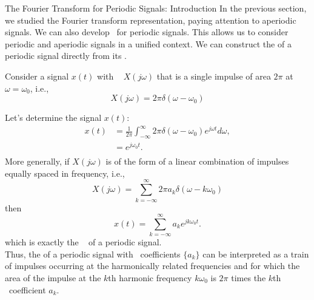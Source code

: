 \begin{frame}{The Fourier Transform for Periodic Signals: Introduction}
    In the previous section, we studied the Fourier transform representation, paying attention to aperiodic signals. We can also develop \ftrs~for periodic signals. This allows us to consider periodic and aperiodic signals in a unified context. We can construct the \ft of a periodic signal directly from its \fsr .

    Consider a signal $x(t)$  with \ft~ $X(j\omega)$ that is a single impulse of area $2\pi$ at $\omega=\omega_0$, i.e.,
{
    \begin{equation}
        X(j\omega) = 2\pi \delta(\omega-\omega_0)
    \end{equation}
}


\end{frame}

\begin{frame}
    Let's determine the signal $x(t)$:
    \pause
    {
        \begin{equation*}
            \begin{split}
                x(t) &= \frac{1}{2\pi}\int_{-\infty}^{\infty} 2\pi \delta(\omega-\omega_0)e^{j\omega t} d\omega,\\
                &= e^{j\omega_0 t}.\\
            \end{split}
        \end{equation*}
        \pause
        More generally, if $X(j\omega)$ is of the form of a linear combination of impulses equally spaced in frequency, i.e.,
        \begin{equation}
             X(j\omega) = \sum_{k=-\infty}^{\infty}2\pi a_k \delta(\omega-k\omega_0)
        \end{equation}
        \pause
        then
        \begin{equation}
            x(t) = \sum_{k=-\infty}^{\infty}a_ke^{jk\omega_0 t}.
        \end{equation}
        which is exactly the \fsr~ of a periodic signal. \\
        Thus, the \ft of a periodic signal with \fs~coefficients $\{a_k\}$ can be interpreted as a train of impulses occurring at the harmonically related frequencies and for which the area of the impulse at the $k$th harmonic frequency $k\omega_0$ is $2\pi$ times the $k$th \fs~coefficient $a_k$.
    }

\end{frame}


